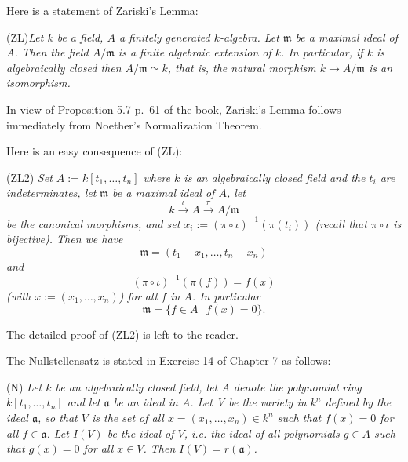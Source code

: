\documentclass[parskip=half,fontsize=12pt]{scrartcl}%
\newcommand{\mf}{\mathfrak}
\begin{document}

Here is a statement of Zariski's Lemma:

(ZL)\emph{Let $k$ be a field, $A$ a finitely generated $k$-algebra. Let $\mf m$ be a maximal ideal of $A$. Then the field $A/\mf m$ is a finite algebraic extension of $k$. In particular, if $k$ is algebraically closed then $A/\mf m\simeq k$, that is, the natural morphism $k\to A/\mf m$ is an isomorphism.}

In view of Proposition 5.7 p.~61 of the book, Zariski's Lemma follows immediately from Noether's Normalization Theorem. %

Here is an easy consequence of (ZL):

(ZL2) \emph{Set $A:=k[t_1,\dots,t_n]$ where $k$ is an algebraically closed field and the $t_i$ are indeterminates, let $\mf m$ be a maximal ideal of $A$, let} 
$$
k\xrightarrow\iota A\xrightarrow{\pi}A/\mf m
$$ 
\emph{be the canonical morphisms, and set $x_i:=(\pi\circ\iota)^{-1}(\pi(t_i))$ (recall that $\pi\circ\iota$ is bijective). Then we have} 
$$
\mf m=(t_1-x_1,\dots,t_n-x_n)
$$ 
\emph{and} 
$$
(\pi\circ\iota)^{-1}(\pi(f))=f(x)
$$ 
\emph{(with $x:=(x_1,\dots,x_n)$) for all $f$ in $A$. In particular} 
$$
\mf m=\{f\in A\ |\ f(x)=0\}.
$$

The detailed proof of (ZL2) is left to the reader.

The Nullstellensatz is stated in Exercise 14 of Chapter 7 as follows:

(N) \emph{Let $k$ be an algebraically closed field, let $A$ denote the polynomial ring $k[t_1,\dots,t_n]$ and let $\mf a$ be an ideal in $A$. Let V be the variety in $k^n$ defined by the ideal $\mf a$, so that $V$ is the set of all $x=(x_1,\dots,x_n)\in k^n$ such that $f(x)=0$ for all $f\in\mf a$. Let $I(V)$ be the ideal of $V$, i.e. the ideal of all polynomials $g\in A$ such that $g(x)=0$ for all $x\in V$. Then $I(V)=r(\mf a)$.}
\end{document}
